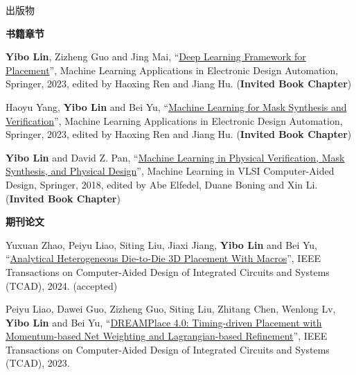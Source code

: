 \begin{rSection}{出版物}



\textbf{书籍章节}
        

\begin{description}[font=\normalfont, rightmargin=2em]
    

\item[{[B3]}]{
        \textbf{Yibo Lin}, Zizheng Guo and Jing Mai, 
    ``\href{https://doi.org/10.1007/978-3-031-13074-8}{Deep Learning Framework for Placement}'', 
    Machine Learning Applications in Electronic Design Automation, Springer, 2023, edited by Haoxing Ren and Jiang Hu.
    (\textbf{Invited Book Chapter})
}
            

\item[{[B2]}]{
        Haoyu Yang, \textbf{Yibo Lin} and Bei Yu, 
    ``\href{https://doi.org/10.1007/978-3-031-13074-8}{Machine Learning for Mask Synthesis and Verification}'', 
    Machine Learning Applications in Electronic Design Automation, Springer, 2023, edited by Haoxing Ren and Jiang Hu.
    (\textbf{Invited Book Chapter})
}
            

\item[{[B1]}]{
        \textbf{Yibo Lin} and David Z. Pan, 
    ``\href{http://dx.doi.org/10.1007/978-3-030-04666-8_4}{Machine Learning in Physical Verification, Mask Synthesis, and Physical Design}'', 
    Machine Learning in VLSI Computer-Aided Design, Springer, 2018, edited by Abe Elfedel, Duane Boning and Xin Li.
    (\textbf{Invited Book Chapter})
}
            

\end{description}
    

\textbf{期刊论文}
        

\begin{description}[font=\normalfont, rightmargin=2em]
    

\item[{[J52]}]{
        Yuxuan Zhao, Peiyu Liao, Siting Liu, Jiaxi Jiang, \textbf{Yibo Lin} and Bei Yu, 
    ``\href{https://doi.org/10.1109/TCAD.2024.3444716}{Analytical Heterogeneous Die-to-Die 3D Placement With Macros}'', 
    IEEE Transactions on Computer-Aided Design of Integrated Circuits and Systems (TCAD), 2024.
    (accepted)
}
            

\item[{[J51]}]{
        Peiyu Liao, Dawei Guo, Zizheng Guo, Siting Liu, Zhitang Chen, Wenlong Lv, \textbf{Yibo Lin} and Bei Yu, 
    ``\href{https://doi.org/10.1109/TCAD.2023.3240132}{DREAMPlace 4.0: Timing-driven Placement with Momentum-based Net Weighting and Lagrangian-based Refinement}'', 
    IEEE Transactions on Computer-Aided Design of Integrated Circuits and Systems (TCAD), 2023.
    
}
\end{description}
\end{rSection}

